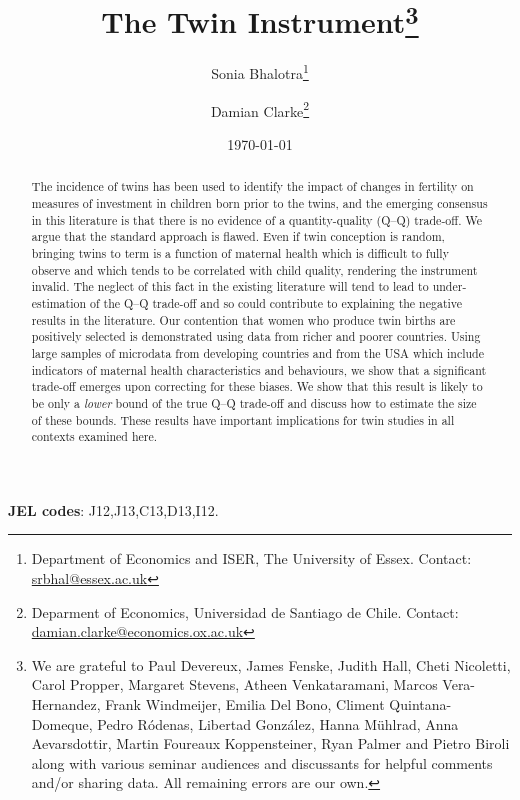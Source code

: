 \documentclass[subeqn]{article}
\title{The Twin Instrument\footnote{We are grateful to Paul Devereux, James 
    Fenske, Judith Hall, Cheti Nicoletti, Carol Propper, Margaret Stevens,
    Atheen Venkataramani, Marcos Vera-Hernandez, Frank Windmeijer,
    Emilia Del Bono, Climent Quintana-Domeque, Pedro R\'odenas, Libertad
    Gonz\'alez, Hanna M\"uhlrad, Anna Aevarsdottir, Martin Foureaux
    Koppensteiner, Ryan Palmer and Pietro Biroli along with various seminar
    audiences and discussants for helpful comments and/or sharing data. All
    remaining errors are our own.}}
\author{Sonia Bhalotra\thanks{Department of Economics and ISER, The University of
    Essex. Contact: \href{mailto:srbhal@essex.ac.uk}{srbhal@essex.ac.uk}} 
\and Damian Clarke\thanks{Deparment of Economics, Universidad de Santiago de Chile.
Contact: \href{mailto:damian.clarke@usach.cl}
{damian.clarke@economics.ox.ac.uk}}}
\date{\today}
\begin{document}
\begin{spacing}{1.4}

\maketitle
\vspace{-1cm}
\begin{abstract}
 The incidence of twins has been used to identify the impact of changes in 
 fertility on measures of investment in children born prior to the twins, and
 the emerging consensus in this literature is that there is no evidence of a
 quantity-quality (Q--Q) trade-off. We argue that the standard approach is 
 flawed. Even if twin conception is random, bringing twins to term is a function 
 of maternal health which is difficult to fully observe and which tends to be
 correlated with child quality, rendering the instrument invalid. The neglect
 of this fact in the existing literature will tend to lead to under-estimation 
 of the Q--Q trade-off and so could contribute to explaining the negative results
 in the literature. Our contention that women who produce twin births are
 positively selected is demonstrated using data from richer and poorer countries.
 Using large samples of microdata from developing countries and from the USA 
 which include indicators of maternal health characteristics and behaviours, we
 show that a significant trade-off emerges upon correcting for these biases. We
 show that this result is likely to be only a \emph{lower} bound of the true
 Q--Q trade-off and discuss how to estimate the size of these bounds. These
 results have important implications for twin studies in all contexts examined
 here.
\\
\end{abstract}
\hspace{4mm}\textbf{\small JEL codes}: J12,J13,C13,D13,I12. \\

\newpage

\end{spacing}
\end{document}

